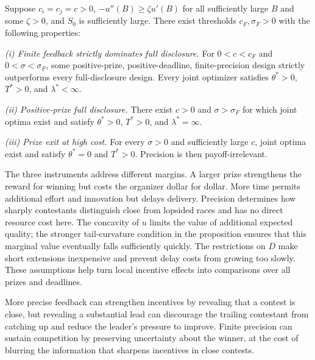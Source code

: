 \documentclass[mnsc]{informs3}
\begin{document}
\par\noindent\begin{minipage}{\textwidth}\OneAndAHalfSpacedXI
\begin{proposition}\label{prop-joint-design}
{Suppose $c_i=c_j=c>0$, $-u''(B)\geq\zeta u'(B)$ for all sufficiently large $B$ and some $\zeta>0$, and $S_0$ is sufficiently large. There exist thresholds $c_F,\sigma_F>0$ with the following properties:}

{\emph{(i) Finite feedback strictly dominates full disclosure.}
For $0<c<c_F$ and $0<\sigma<\sigma_F$, some positive-prize,
positive-deadline, finite-precision design strictly outperforms every
full-disclosure design. Every joint optimizer satisfies $\theta^*>0$,
$T^*>0$, and $\lambda^*<\infty$.}

\emph{(ii) Positive-prize full disclosure.}
There exist $c>0$ and $\sigma>\sigma_F$ for which joint optima exist and satisfy $\theta^*>0$, $T^*>0$, and $\lambda^*=\infty$.

\emph{(iii) Prize exit at high cost.}
For every $\sigma>0$ and sufficiently large $c$, joint optima exist and satisfy $\theta^*=0$ and $T^*>0$. Precision is then payoff-irrelevant.
\end{proposition}
\end{minipage}\par\smallskip

The three instruments address different margins. A larger prize strengthens the reward for winning but costs the organizer dollar for dollar. More time permits additional effort and innovation but delays delivery. Precision determines how sharply contestants distinguish close from lopsided races and has no direct resource cost here. The concavity of $u$ limits the value of additional expected quality; the stronger tail-curvature condition in the proposition ensures that this marginal value eventually falls sufficiently quickly. The restrictions on $D$ make short extensions inexpensive and prevent delay costs from growing too slowly. These assumptions help turn local incentive effects into comparisons over all prizes and deadlines.

More precise feedback can strengthen incentives by revealing that a contest is close, but revealing a substantial lead can discourage the trailing contestant from catching up and reduce the leader's pressure to improve. Finite precision can sustain competition by preserving uncertainty about the winner, at the cost of blurring the information that sharpens incentives in close contests.
\end{document}
